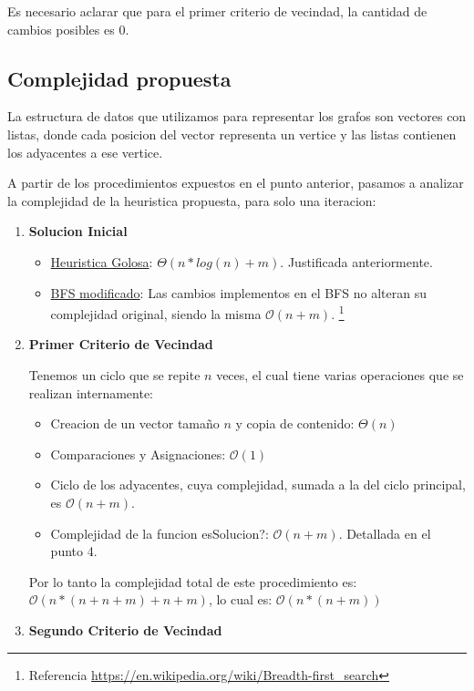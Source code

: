 Es necesario aclarar que para el primer criterio de vecindad, la cantidad de cambios posibles es 0.

\subsection{Complejidad propuesta}
La estructura de datos que utilizamos para representar los grafos son vectores con listas, donde cada posicion del vector representa un vertice y las listas contienen los adyacentes a ese vertice.

A partir de los procedimientos expuestos en el punto anterior, pasamos a analizar la complejidad de la heuristica propuesta, para solo una iteracion:

\begin{enumerate}
  \item \textbf{Solucion Inicial}
    \begin{itemize}
    	\item \underline{Heuristica Golosa}: $\Theta{(n*log(n) + m)}$. Justificada anteriormente.
        \item \underline{BFS modificado}: Las cambios implementos en el BFS no alteran su complejidad original, siendo la misma $\mathcal{O}(n + m)$. \footnote{Referencia \url{https://en.wikipedia.org/wiki/Breadth-first_search}}
    \end{itemize}
  \item \textbf{Primer Criterio de Vecindad}
  
  Tenemos un ciclo que se repite $n$ veces, el cual tiene varias operaciones que se realizan internamente:
  \begin{itemize}
    \item Creacion de un vector tamaño $n$ y copia de contenido: $\Theta{(n)}$
    \item Comparaciones y Asignaciones: $\mathcal{O}(1)$
    \item Ciclo de los adyacentes, cuya complejidad, sumada a la del ciclo principal, es $\mathcal{O}(n + m)$.
    \item Complejidad de la funcion esSolucion?: $\mathcal{O}(n + m)$. Detallada en el punto 4.
  \end{itemize}
  Por lo tanto la complejidad total de este procedimiento es: $\mathcal{O}(n*(n + n + m) + n + m)$, lo cual es: $\mathcal{O}(n*(n + m))$
  
  \item \textbf{Segundo Criterio de Vecindad}
  

\end{enumerate}
